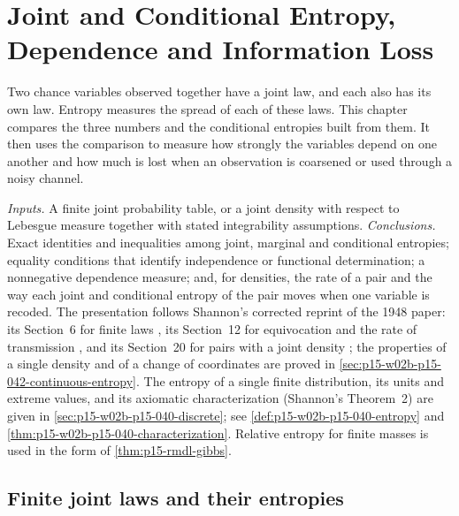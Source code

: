 \chapter{Joint and Conditional Entropy, Dependence and Information Loss}
\label{sec:p15-w02b-p15-041}

Two chance variables observed together have a joint law, and each also
has its own law. Entropy measures the spread of each of these laws.
This chapter compares the three numbers and the conditional entropies
built from them. It then uses the comparison to measure how strongly the
variables depend on one another and how much is lost when an observation
is coarsened or used through a noisy channel.

\emph{Inputs.} A finite joint probability table, or a joint density
with respect to Lebesgue measure together with stated integrability
assumptions. \emph{Conclusions.} Exact identities and inequalities
among joint, marginal and conditional entropies; equality conditions
that identify independence or functional determination; a nonnegative
dependence measure; and, for densities, the rate of a pair and the way
each joint and conditional entropy of the pair moves when one variable
is recoded. The presentation follows Shannon's
corrected reprint of the 1948 paper: its Section~6 for finite laws
\cite[pp.~11--12]{Shannon1948MathematicalTheory}, its Section~12 for
equivocation and the rate of transmission
\cite[pp.~20--21]{Shannon1948MathematicalTheory}, and its Section~20
for pairs with a joint density
\cite[pp.~35--38]{Shannon1948MathematicalTheory}; the properties of a
single density and of a change of coordinates are proved in
\cref{sec:p15-w02b-p15-042-continuous-entropy}. The entropy of a
single finite distribution, its units and extreme values, and its
axiomatic characterization (Shannon's Theorem~2) are given in
\cref{sec:p15-w02b-p15-040-discrete}; see
\cref{def:p15-w02b-p15-040-entropy} and
\cref{thm:p15-w02b-p15-040-characterization}. Relative entropy for finite masses is used in
the form of \cref{thm:p15-rmdl-gibbs}.

\section{Finite joint laws and their entropies}
\label{sec:p15-w02b-p15-041-finite}

